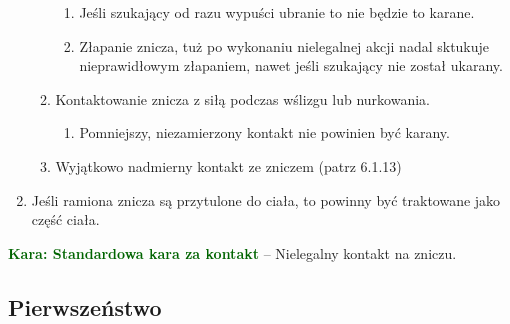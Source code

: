 \documentclass[11pt,a4paper]{article}
\newcommand\penaltyd[2]{\bgroup\textcolor{darkgreen}{\textbf{Kara: #1}} -- #2}
\begin{document}
\begin{enumerate}
\begin{enumerate}
    \begin{enumerate}
      \item Jeśli szukający od razu wypuści ubranie to nie będzie to karane.
      \item Złapanie znicza, tuż po wykonaniu nielegalnej akcji nadal sktukuje nieprawidłowym złapaniem, nawet jeśli szukający nie został ukarany.
    \end{enumerate}
    \item Kontaktowanie znicza z siłą podczas wślizgu lub nurkowania.
    \begin{enumerate}
      \item Pomniejszy, niezamierzony kontakt nie powinien być karany.
    \end{enumerate}
    \item Wyjątkowo nadmierny kontakt ze zniczem (patrz 6.1.13) %
  \end{enumerate}
  \item Jeśli ramiona znicza są przytulone do ciała, to powinny być traktowane jako część ciała.
\end{enumerate}

\penaltyd{Standardowa kara za kontakt}{Nielegalny kontakt na zniczu.}

\subsection{Pierwszeństwo}
\end{document}
